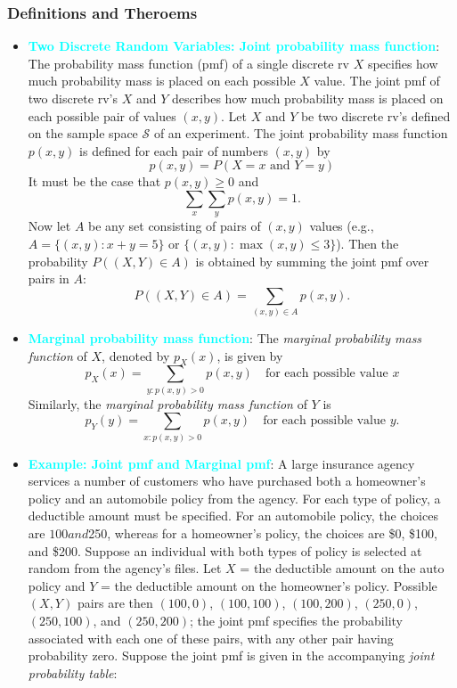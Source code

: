 \documentclass{report}
\begin{document}
    \subsubsection{Definitions and Theroems}
    \begin{itemize}
        \item \textbf{\textcolor{cyan}{Two Discrete Random Variables: Joint probability mass function}}:
            The probability mass function (pmf) of a single discrete rv \( X \) specifies how much probability mass is placed on each possible \( X \) value. The joint pmf of two discrete rv's \( X \) and \( Y \) describes how much probability mass is placed on each possible pair of values \((x, y)\).
            \bigbreak \noindent 
            Let \( X \) and \( Y \) be two discrete rv's defined on the sample space \( \mathcal{S} \) of an experiment. The joint probability mass function \( p(x, y) \) is defined for each pair of numbers \((x, y)\) by
            \[ 
                p(x, y) = P(X = x \text{ and } Y = y) 
            \]
            It must be the case that \( p(x, y) \geq 0 \) and 
            \[
                \sum_x \sum_y p(x, y) = 1.
            \]
            Now let \( A \) be any set consisting of pairs of \((x, y)\) values (e.g., \( A = \{(x, y): x + y = 5\} \) or \(\{(x, y): \max(x, y) \leq 3\} \)). Then the probability \( P((X, Y) \in A) \) is obtained by summing the joint pmf over pairs in \( A \):
            \[
                P((X, Y) \in A) = \sum_{(x, y) \in A} p(x, y).
            \]
        \item \textbf{\textcolor{cyan}{Marginal probability mass function}}:
            The \textit{marginal probability mass function} of \(X\), denoted by \(p_X(x)\), is given by
            \[
                p_X(x) = \sum_{y: p(x, y) > 0} p(x, y) \quad \text{for each possible value } x
            \]
            Similarly, the \textit{marginal probability mass function} of \(Y\) is
            \[
                p_Y(y) = \sum_{x: p(x, y) > 0} p(x, y) \quad \text{for each possible value } y.
            \]
        \item \textbf{\textcolor{cyan}{Example: Joint pmf and Marginal pmf}}:
            A large insurance agency services a number of customers who have purchased both a homeowner’s policy and an automobile policy from the agency. For each type of policy, a deductible amount must be specified. For an automobile policy, the choices are $100 and $250, whereas for a homeowner’s policy, the choices are \$0, \$100, and \$200. Suppose an individual with both types of policy is selected at random from the agency’s files. Let \( X \) = the deductible amount on the auto policy and \( Y \) = the deductible amount on the homeowner’s policy. Possible \((X, Y)\) pairs are then \((100, 0)\), \((100, 100)\), \((100, 200)\), \((250, 0)\), \((250, 100)\), and \((250, 200)\); the joint pmf specifies the probability associated with each one of these pairs, with any other pair having probability zero. Suppose the joint pmf is given in the accompanying \textit{joint probability table}:

\end{itemize}
\end{document}
